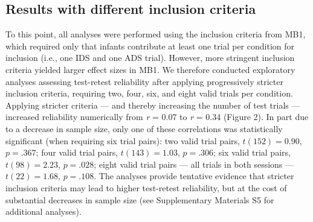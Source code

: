 \documentclass[
  man,floatsintext]{apa6}
\begin{document}
\hypertarget{results-with-different-inclusion-criteria}{%
\subsection{Results with different inclusion criteria}\label{results-with-different-inclusion-criteria}}

To this point, all analyses were performed using the inclusion criteria from MB1, which required only that infants contribute at least one trial per condition for inclusion (i.e., one IDS and one ADS trial).
However, more stringent inclusion criteria yielded larger effect sizes in MB1.
We therefore conducted exploratory analyses assessing test-retest reliability after applying progressively stricter inclusion criteria, requiring two, four, six, and eight valid trials per condition.
Applying stricter criteria --- and thereby increasing the number of test trials --- increased reliability numerically from \emph{r} = 0.07 to \emph{r} = 0.34 (Figure 2).
In part due to a decrease in sample size, only one of these correlations was statistically significant (when requiring six trial pairs): two valid trial pairs, \(t(152) = 0.90\), \(p = .367\); four valid trial pairs, \(t(143) = 1.03\), \(p = .306\); six valid trial pairs, \(t(98) = 2.23\), \(p = .028\); eight valid trial pairs --- all trials in both sessions --- \(t(22) = 1.68\), \(p = .108\).
The analyses provide tentative evidence that stricter inclusion criteria may lead to higher test-retest reliability, but at the cost of substantial decreases in sample size (see Supplementary Materials S5 for additional analyses).
\end{document}
